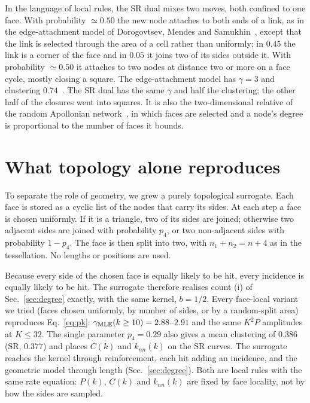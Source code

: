 \documentclass[pre,twocolumn,superscriptaddress,amsmath,amssymb,floatfix]{revtex4-2}
\begin{document}
In the language of local rules, the SR dual mixes two moves, both confined to one
face. With probability $\simeq0.50$ the new node attaches to both ends of a link, as in
the edge-attachment model of Dorogovtsev, Mendes and Samukhin~\cite{dorogovtsev2001},
except that the link is selected through the area of a cell rather than uniformly; in
$0.45$ the link is a corner of the face and in $0.05$ it joins two of its sides outside
it. With probability $\simeq0.50$ it attaches to two nodes at distance two or more on a
face cycle, mostly closing a square. The edge-attachment model has $\gamma=3$ and
clustering $0.74$~\cite{dorogovtsev2001,dorogovtsevgoltsev2002}. The SR dual has the
same $\gamma$ and half the clustering; the other half of the closures went into squares.
It is also the two-dimensional relative of the random Apollonian
network~\cite{andrade2005,zhou2005}, in which faces are selected and a node's degree is
proportional to the number of faces it bounds.

\section{What topology alone reproduces}
\label{sec:topology}

To separate the role of geometry, we grew a purely topological surrogate. Each face is
stored as a cyclic list of the nodes that carry its sides. At each step a face is chosen
uniformly. If it is a triangle, two of its sides are joined; otherwise two adjacent
sides are joined with probability $p_4$, or two non-adjacent sides with probability
$1-p_4$. The face is then split into two, with $n_1+n_2=n+4$ as in the tessellation.
No lengths or positions are used.

Because every side of the chosen face is equally likely to be hit, every incidence is
equally likely to be hit. The surrogate therefore realises count (i) of
Sec.~\ref{sec:degree} exactly, with the same kernel, $b=1/2$. Every face-local variant we tried (faces chosen
uniformly, by number of sides, or by a random-split area) reproduces
Eq.~\eqref{eq:pk}: $\gamma_{\rm MLE}(k\ge10)=2.88$--$2.91$ and the same $K^2P$
amplitudes at $K\le32$. The single parameter $p_4=0.29$ also gives a mean clustering of
$0.386$ (SR, $0.377$) and places $C(k)$ and $k_{nn}(k)$ on the SR curves. The surrogate
reaches the kernel through reinforcement, each hit adding an incidence, and the
geometric model through length (Sec.~\ref{sec:degree}). Both are local rules with the
same rate equation: $P(k)$, $C(k)$ and $k_{nn}(k)$ are fixed by face locality, not by how
the sides are sampled.
\end{document}
